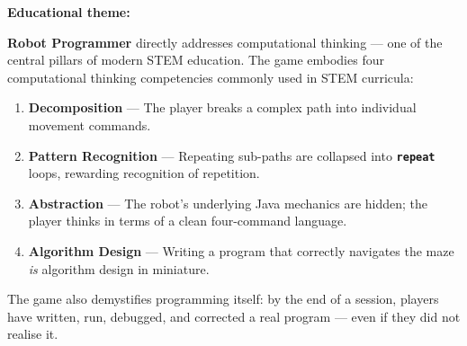 \documentclass[12pt,a4paper]{article}
\newcommand{\keyword}[1]{\textcolor{keyword}{\texttt{\bfseries #1}}}
\newcommand{\gddfield}[2]{%
  \noindent\begin{minipage}[t]{3.5cm}\bfseries\color{accent}\sffamily#1\end{minipage}%
  \hspace{8pt}%
  \begin{minipage}[t]{\dimexpr\linewidth-3.5cm-8pt\relax}%
    #2
  \end{minipage}\par\smallskip}
\begin{document}
\vspace{6pt}

\begin{tcolorbox}[gddbox, title={Theme}]
\gddfield{Educational theme:}{%
\textbf{Robot Programmer} directly addresses computational thinking — one of the central pillars of modern STEM education. The game embodies four computational thinking competencies commonly used in STEM curricula:
}

\vspace{4pt}
\begin{enumerate}[leftmargin=2em, label=\textbf{\arabic*.}]
  \item \textbf{Decomposition} — The player breaks a complex path into individual movement commands.
  \item \textbf{Pattern Recognition} — Repeating sub-paths are collapsed into \keyword{repeat} loops, rewarding recognition of repetition.
  \item \textbf{Abstraction} — The robot's underlying Java mechanics are hidden; the player thinks in terms of a clean four-command language.
  \item \textbf{Algorithm Design} — Writing a program that correctly navigates the maze \emph{is} algorithm design in miniature.
\end{enumerate}

\vspace{4pt}
The game also demystifies programming itself: by the end of a session, players have written, run, debugged, and corrected a real program — even if they did not realise it.
\end{tcolorbox}

\vspace{6pt}
\end{document}
